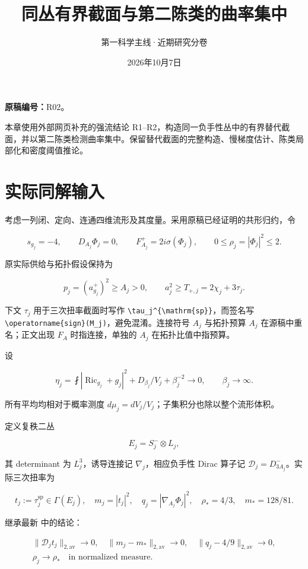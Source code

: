 \documentclass[UTF8,11pt,fontset=none]{ctexart}
\title{同丛有界截面与第二陈类的曲率集中}
\author{第一科学主线·近期研究分卷}
\date{2026年10月7日}
\begin{document}
\maketitle
\noindent\textbf{原稿编号：}R02。

本章使用外部网页补充的强流结论 R1--R2，构造同一负手性丛中的有界替代截面，并以第二陈类检测曲率集中。保留替代截面的完整构造、慢梯度估计、陈类局部化和密度阈值推论。\cite{R02,Strong}

\section{实际同解输入}\label{ch2:ux5b9eux9645ux540cux89e3ux8f93ux5165}

考虑一列闭、定向、连通四维流形及其度量。采用原稿已经证明的共形归约，令

\[
 s_{g_j}=-4,\qquad D_{A_j}\Phi_j=0,\qquad
 F_{A_j}^{+}=2i\sigma(\Phi_j),\qquad 0\le\rho_j=|\Phi_j|^2\le2.
\]

原实际供给与拓扑假设保持为

\[
 p_j=(a_{g_j}^{+})^2\ge A_j>0,\qquad a_j^2\ge T_{+,j}=2\chi_j+3\tau_j.
\]

下文 \(\tau_j\) 用于三次扭率截面时写作 \texttt{\textbackslash{}tau\_j\^{}\{\textbackslash{}mathrm\{sp\}\}}，而签名写 \texttt{\textbackslash{}operatorname\{sign\}(M\_j)}，避免混淆。连接符号 \(A_j\) 与拓扑预算 \(A_j\) 在源稿中重名；正文出现 \(F_A\) 时指连接，单独的 \(A_j\) 在拓扑比值中指预算。

设

\[
 \eta_j=\fint|\operatorname{Ric}_{g_j}+g_j|^2
       +D_{\beta_j}/V_j+\beta_j^{-2}\longrightarrow0,
 \qquad\beta_j\longrightarrow\infty.
\]

所有平均均相对于概率测度 \(d\mu_j=dV_j/V_j\)；子集积分也除以整个流形体积。

定义复秩二丛

\[
 E_j=S^-_j\otimes L_j,
\]

其 determinant 为 \(L_j^3\)，诱导连接记 \(\nabla_j\)，相应负手性 Dirac 算子记 \(\mathcal D_j=D^-_{3A_j}\)。实际三次扭率为

\[
 t_j:=\tau_j^{\mathrm{sp}}\in\Gamma(E_j),\quad
 m_j=|t_j|^2,\quad q_j=|\nabla_{A_j}\Phi_j|^2,
 \quad \rho_*=4/3,\quad m_*=128/81.
\]

继承最新  中的结论：

\[
 \begin{gathered}
 \|\mathcal D_jt_j\|_{2,\mathrm{av}}\to0,\quad \|m_j-m_*\|_{2,\mathrm{av}}\to0,\quad \|q_j-4/9\|_{2,\mathrm{av}}\to0,\\
 \rho_j\to\rho_*\quad\text{in normalized measure}.
 \end{gathered}
 \tag{2.1}\label{eq:r2:1}
\]
\end{document}
